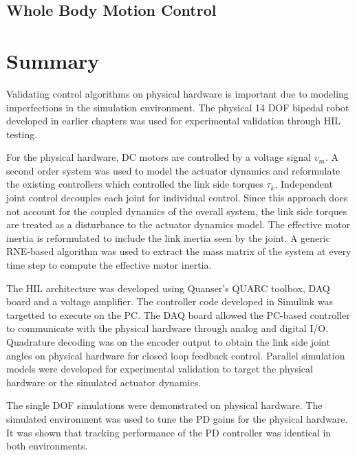 
\subsection{Whole Body Motion Control} %
\label{sub:whole_body_motion_control}
\Incomplete


\section{Summary} %
\label{sec:experiments_summary}
Validating control algorithms on physical hardware is important due to modeling imperfections in the simulation environment. The physical 14 DOF bipedal robot developed in earlier chapters was used for experimental validation through HIL testing. 

For the physical hardware, DC motors are controlled by a voltage signal $v_m$. A second order system was used to model the actuator dynamics and reformulate the existing controllers which controlled the link side torques $\tau _k$. Independent joint control decouples each joint for individual control. Since this approach does not account for the coupled dynamics of the overall system, the link side torques are treated as a disturbance to the actuator dynamics model. The effective motor inertia is reformulated to include the link inertia seen by the joint. A generic RNE-based algorithm was used to extract the mass matrix of the system at every time step to compute the effective motor inertia.

The HIL architecture was developed using Quanser's QUARC toolbox, DAQ board and a voltage amplifier. The controller code developed in Simulink was targetted to execute on the PC. The DAQ board allowed the PC-based controller to communicate with the physical hardware through analog and digital I/O. Quadrature decoding was on the encoder output to obtain the link side joint angles on physical hardware for closed loop feedback control. Parallel simulation models were developed for experimental validation to target the physical hardware or the simulated actuator dynamics. 

The single DOF simulations were demonstrated on physical hardware. The simulated environment was used to tune the PD gains for the physical hardware. It was shown that tracking performance of the PD controller was identical in both environments.  

\Incomplete

